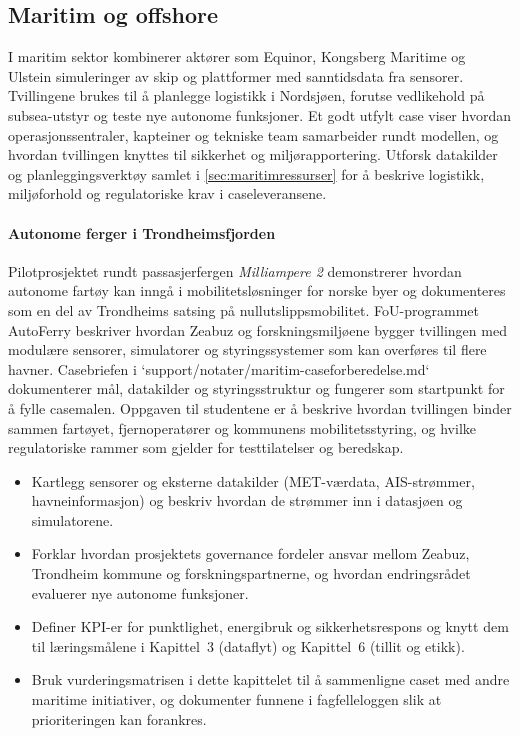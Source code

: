 \subsection*{Maritim og offshore}
I maritim sektor kombinerer aktører som Equinor, Kongsberg Maritime og Ulstein simuleringer av skip og plattformer med sanntidsdata fra sensorer. Tvillingene brukes til å planlegge logistikk i Nordsjøen, forutse vedlikehold på subsea-utstyr og teste nye autonome funksjoner. Et godt utfylt case viser hvordan operasjonssentraler, kapteiner og tekniske team samarbeider rundt modellen, og hvordan tvillingen knyttes til sikkerhet og miljørapportering. Utforsk datakilder og planleggingsverktøy samlet i \autoref{sec:maritimressurser} for å beskrive logistikk, miljøforhold og regulatoriske krav i caseleveransene.

\paragraph{Autonome ferger i Trondheimsfjorden}
Pilotprosjektet rundt passasjerfergen \emph{Milliampere 2} demonstrerer hvordan autonome fartøy kan inngå i mobilitetsløsninger for norske byer og dokumenteres som en del av Trondheims satsing på nullutslippsmobilitet.\citep{ntnu2023milliampere2} FoU-programmet AutoFerry beskriver hvordan Zeabuz og forskningsmiljøene bygger tvillingen med modulære sensorer, simulatorer og styringssystemer som kan overføres til flere havner.\citep{sintef2024autoferry} Casebriefen i `support/notater/maritim-caseforberedelse.md` dokumenterer mål, datakilder og styringsstruktur og fungerer som startpunkt for å fylle casemalen. Oppgaven til studentene er å beskrive hvordan tvillingen binder sammen fartøyet, fjernoperatører og kommunens mobilitetsstyring, og hvilke regulatoriske rammer som gjelder for testtilatelser og beredskap.

\begin{itemize}
    \item Kartlegg sensorer og eksterne datakilder (MET-værdata, AIS-strømmer, havneinformasjon) og beskriv hvordan de strømmer inn i datasjøen og simulatorene.
    \item Forklar hvordan prosjektets governance fordeler ansvar mellom Zeabuz, Trondheim kommune og forskningspartnerne, og hvordan endringsrådet evaluerer nye autonome funksjoner.
    \item Definer KPI-er for punktlighet, energibruk og sikkerhetsrespons og knytt dem til læringsmålene i Kapittel~3 (dataflyt) og Kapittel~6 (tillit og etikk).
    \item Bruk vurderingsmatrisen i dette kapittelet til å sammenligne caset med andre maritime initiativer, og dokumenter funnene i fagfelleloggen slik at prioriteringen kan forankres.
\end{itemize}


